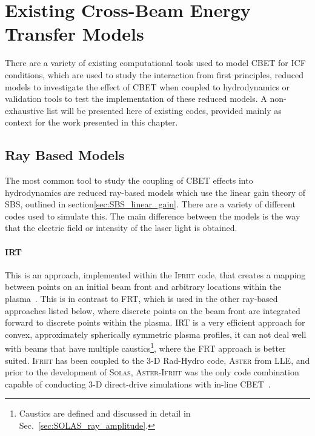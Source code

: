 \section{Existing Cross-Beam Energy Transfer Models}

There are a variety of existing computational tools used to model \ac{CBET} for \ac{ICF} conditions, which are used to study the interaction from first principles, reduced models to investigate the effect of \ac{CBET} when coupled to hydrodynamics or validation tools to test the implementation of these reduced models.
A non-exhaustive list will be presented here of existing codes, provided mainly as context for the work presented in this chapter.

\subsection{Ray Based Models}

The most common tool to study the coupling of \ac{CBET} effects into hydrodynamics are reduced ray-based models which use the linear gain theory of \ac{SBS}, outlined in section\ref{sec:SBS_linear_gain}.
There are a variety of different codes used to simulate this.
The main difference between the models is the way that the electric field or intensity of the laser light is obtained.

\paragraph*{\ac{IRT}} This is an approach, implemented within the \textsc{Ifriit} code, that creates a mapping between points on an initial beam front and arbitrary locations within the plasma~\cite{colaitis_real_2019,colaitis_adaptive_2019}.
This is in contrast to \ac{FRT}, which is used in the other ray-based approaches listed below, where discrete points on the beam front are integrated forward to discrete points within the plasma.
\ac{IRT} is a very efficient approach for convex, approximately spherically symmetric plasma profiles, it can not deal well with beams that have multiple caustics\footnote{Caustics are defined and discussed in detail in Sec.~\ref{sec:SOLAS_ray_amplitude}.}, where the \ac{FRT} approach is better suited.
\textsc{Ifriit} has been coupled to the 3-D \ac{Rad-Hydro} code, \textsc{Aster} from \ac{LLE}, and prior to the development of \textsc{Solas}, \textsc{Aster}-\textsc{Ifriit} was the only code combination capable of conducting 3-D direct-drive simulations with in-line \ac{CBET}~\cite{colaitis_inverse_2021}.


